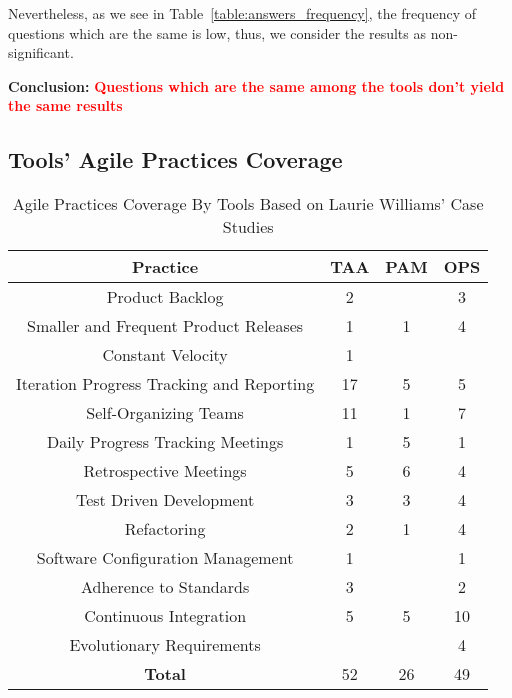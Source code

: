 Nevertheless, as we see in Table~\ref{table:answers_frequency}, the frequency of questions which are the same is low, thus, we consider the results as non-significant.

\textbf{Conclusion:} \textcolor{red}{\textbf{Questions which are the same among the tools don't yield the same results}}

\clearpage

\subsection{Tools' Agile Practices Coverage}

\begin{table} [H]
\centering
	\scriptsize
	\begin{tabular}{| c | c | c | c |} \hline
		\textbf{Practice} & \textbf{TAA} & \textbf{PAM} & \textbf{OPS} \\ \hline
		Product Backlog & 2 & & 3 \\ \hline
		Smaller and Frequent Product Releases & 1 & 1 & 4 \\ \hline
		Constant Velocity & 1 & & \\ \hline
		Iteration Progress Tracking and Reporting & 17 & 5 & 5 \\ \hline
		Self-Organizing Teams & 11 & 1 & 7 \\ \hline
		Daily Progress Tracking Meetings & 1 & 5 & 1 \\ \hline
		Retrospective Meetings & 5 & 6 & 4 \\ \hline
		Test Driven Development & 3 & 3 & 4 \\ \hline
		Refactoring & 2 & 1 & 4 \\ \hline
		Software Configuration Management & 1 & & 1 \\ \hline
		Adherence to Standards & 3 & & 2 \\ \hline
		Continuous Integration & 5 & 5 & 10 \\ \hline	
		Evolutionary Requirements & & & 4 \\ \hline
		\textbf{Total} & 52 & 26 & 49 \\ \hline
	\end{tabular}
	\caption{{\footnotesize Agile Practices Coverage By Tools Based on Laurie Williams' Case Studies}}
\end{table}

\clearpage

